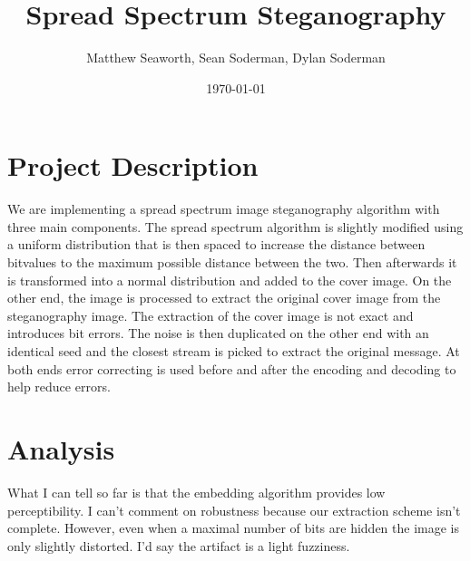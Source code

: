 \documentclass[11pt]{article}
\begin{document}
\title{Spread Spectrum Steganography}
\author{Matthew Seaworth, Sean Soderman, Dylan Soderman}
\date{\today}
\maketitle
\newpage
\section{Project Description}
We are implementing a spread spectrum image steganography algorithm with three main components. The spread spectrum algorithm is slightly
modified using a uniform distribution that is then spaced to increase the distance between bitvalues to the maximum possible distance between
the two. Then afterwards it is transformed into a normal distribution and added to the cover image. On the other end, the image is processed
to extract the original cover image from the steganography image. The extraction of the cover image is not exact and introduces bit errors.
The noise is then duplicated on the other end with an identical seed and the closest stream is picked to extract the original message. At both
ends error correcting is used before and after the encoding and decoding to help reduce errors.

\section{Analysis}
What I can tell so far is that the embedding algorithm provides low perceptibility. I can't comment
on robustness because our extraction scheme isn't complete. However, even when a maximal number
of bits are hidden the image is only slightly distorted. I'd say the artifact is a light fuzziness.
\end{document}
